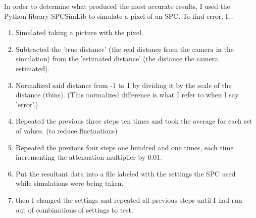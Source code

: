 \documentclass{beamer}
\begin{document}
\begin{frame}
\end{frame}

\begin{frame}
  In order to determine what produced the most accurate results, I used the Python library SPCSimLib \cite{spc} to simulate a pixel of an SPC. To find error, I...
  \begin{enumerate}
  \item Simulated taking a picture with the pixel.
  \item Subtracted the 'true distance' (the real distance from the camera in the simulation) from the 'estimated distance' (the distance the camera estimated).
  \item Normalized said distance from -1 to 1 by dividing it by the scale of the distance (tbins). (This normalized difference is what I refer to when I say 'error'.)
  \item Repeated the previous three steps ten times and took the average for each set of values. (to reduce fluctuations)
  \item Repeated the previous four steps one hundred and one times, each time incrementing the attenuation multiplier by 0.01.
  \item Put the resultant data into a file labeled  with the settings the SPC used while simulations were being taken.
  \item then I changed the settings and repeated all previous steps until I had run out of combinations of settings to test.
  \end{enumerate}
\end{frame}
\end{document}
